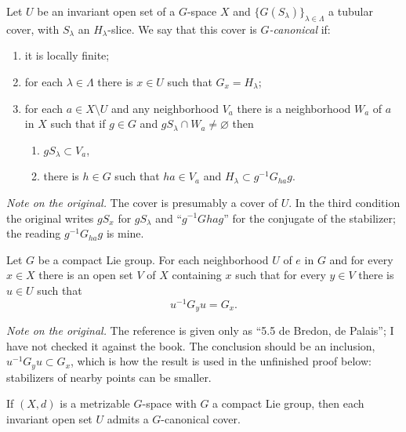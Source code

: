 \begin{definition}
\label{definition-canonical-cover}
Let $U$ be an invariant open set of a
$G$-space $X$ and
$\{G(S_\lambda)\}_{\lambda\in\Lambda}$
a tubular cover, with $S_\lambda$ an
$H_\lambda$-slice. We say that this
cover is {\it $G$-canonical} if:
\begin{enumerate}
\item it is locally finite;
\item for each $\lambda\in\Lambda$
there is $x\in U$ such that
$G_x=H_\lambda$;
\item for each $a\in X\setminus U$ and
any neighborhood $V_a$ there is a
neighborhood $W_a$ of $a$ in $X$ such
that if $g\in G$ and
$gS_\lambda\cap W_a\neq\varnothing$
then
\begin{enumerate}
\item $gS_\lambda\subset V_a$,
\item there is $h\in G$ such that
$ha\in V_a$ and
$H_\lambda\subset g^{-1}G_{ha}g$.
\end{enumerate}
\end{enumerate}
\end{definition}

\noindent
{\it Note on the original.} The cover
is presumably a cover of $U$. In the
third condition the original writes
$gS_x$ for $gS_\lambda$ and
``$g^{-1}Ghag$'' for the conjugate of
the stabilizer; the reading
$g^{-1}G_{ha}g$ is mine.

\begin{proposition}
\label{proposition-bredon-palais}
Let $G$ be a compact Lie group. For
each neighborhood $U$ of $e$ in $G$ and
for every $x\in X$ there is an open set
$V$ of $X$ containing $x$ such that for
every $y\in V$ there is $u\in U$ such
that
$$
u^{-1}G_yu=G_x.
$$
\end{proposition}

\noindent
{\it Note on the original.} The
reference is given only as ``5.5 de
Bredon, de Palais''; I have not checked
it against the book. The conclusion
should be an inclusion,
$u^{-1}G_yu\subset G_x$, which is how
the result is used in the unfinished
proof below: stabilizers of nearby
points can be smaller.

\begin{theorem}
\label{theorem-canonical-cover-exists}
If $(X,d)$ is a metrizable $G$-space
with $G$ a compact Lie group, then
each invariant open set $U$ admits a
$G$-canonical cover.
\end{theorem}

